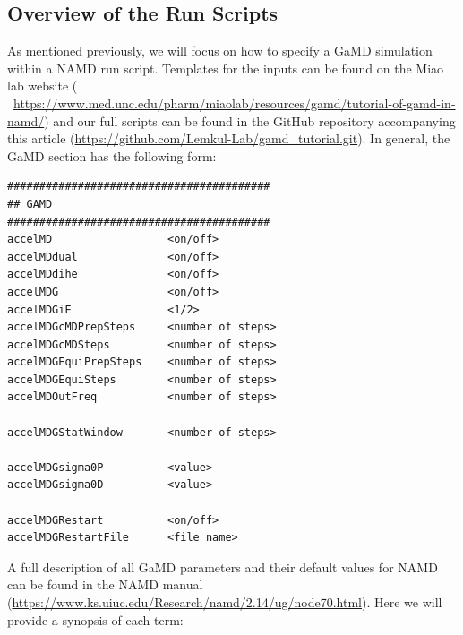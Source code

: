 \documentclass[9pt,tutorial]{livecoms}
\newcommand{\githubrepository}{\url{https://github.com/Lemkul-Lab/gamd_tutorial.git}}  %
\begin{document}
\subsection{Overview of the Run Scripts}
As mentioned previously, we will focus on how to specify a GaMD simulation within a NAMD run script. Templates for the inputs can be found on the Miao lab website ( ~\url{https://www.med.unc.edu/pharm/miaolab/resources/gamd/tutorial-of-gamd-in-namd/}) and our full scripts can be found in the GitHub repository accompanying this article (\githubrepository). In general, the GaMD section has the following form:

\begin{lstlisting}[label=run_script,caption=Conventional and Equilibration Setup, basicstyle=\small, backgroundcolor=\color{light-gray}]
#########################################
## GAMD                    
#########################################
accelMD                  <on/off>	           
accelMDdual              <on/off>	           
accelMDdihe              <on/off>               
accelMDG                 <on/off>	           
accelMDGiE               <1/2>                               
accelMDGcMDPrepSteps     <number of steps>      
accelMDGcMDSteps         <number of steps>	   
accelMDGEquiPrepSteps    <number of steps>      
accelMDGEquiSteps        <number of steps>      
accelMDOutFreq           <number of steps>      

accelMDGStatWindow       <number of steps>	   

accelMDGsigma0P          <value>		             
accelMDGsigma0D          <value>

accelMDGRestart          <on/off> 
accelMDGRestartFile      <file name> 

\end{lstlisting}

\bigskip
A full description of all GaMD parameters and their default values for NAMD can be found in the NAMD manual (\url{https://www.ks.uiuc.edu/Research/namd/2.14/ug/node70.html}). Here we will provide a synopsis of each term:

\bigskip
\end{document}
